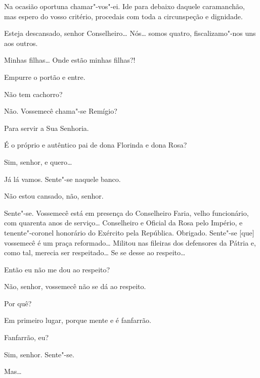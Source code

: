  Na ocasião oportuna chamar"-vos"-ei. Ide para debaixo daquele
caramanchão, mas espero do vosso critério, procedais com toda a circunspeção e
dignidade.

 Esteja descansado, senhor Conselheiro\ldots{} Nós\ldots{} somos quatro,
fiscalizamo"-nos uns aos outros. 




  Minhas filhas\ldots{} Onde estão minhas filhas?!

 Empurre o portão e entre.

 Não tem cachorro?

 Não.  Vossemecê chama"-se Remígio?

 Para servir a Sua Senhoria.

 É o próprio e autêntico pai de dona Florinda e dona
Rosa?

 Sim, senhor, e quero\ldots{}

 Já lá vamos. Sente"-se naquele banco.

 Não estou cansado, não, senhor.

 Sente"-se.   Vossemecê está em
presença do Conselheiro Faria, velho funcionário, com quarenta anos de
serviço\ldots{} Conselheiro e Oficial da Rosa pelo Império, e tenente"-coronel
honorário do Exército pela República.   Obrigado. Sente"-se [que] vossemecê é um praça
reformado\ldots{} Militou nas fileiras dos defensores da Pátria e, como tal, merecia
ser respeitado\ldots{} Se se desse ao respeito\ldots{}

 Então eu não me dou ao respeito?

 Não, senhor, vossemecê não se dá ao respeito.

 Por quê?

 Em primeiro lugar, porque mente e é fanfarrão.

  Fanfarrão, eu?

 Sim, senhor. Sente"-se.

 Mas\ldots{}

